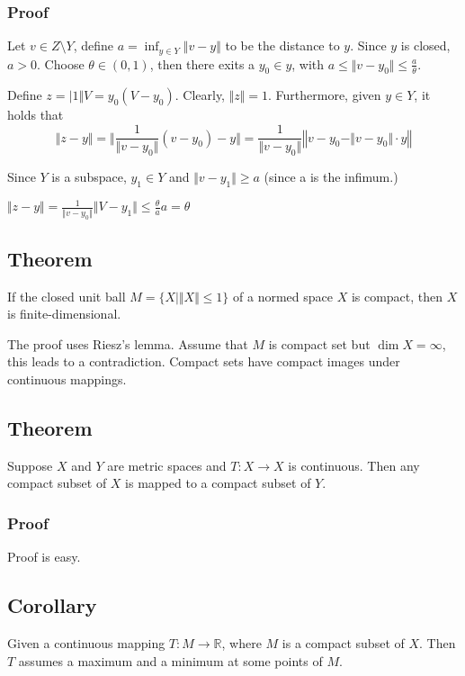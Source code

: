 \documentclass[11pt]{article}
\def\R{\mathbb{R}}
\begin{document}
\subsubsection{Proof}
\label{sec:orgabf9259}
Let \(v\in Z \setminus Y\), define \(a = \inf_{y \in Y} \Vert v - y\Vert\) to
be the distance to \(y\). Since \(y\) is closed, \(a>0\). Choose \(\theta \in (0,
    1)\), then there exits a \(y_0 \in y\), with \(a \le \Vert v - y_0 \Vert \le
    \frac{a}{\theta}\).

Define \(z = \vert{1}{\Vert V = y_0}(V-y_0)\). Clearly, \(\Vert z\Vert = 1\).
Furthermore, given \(y\in Y\), it holds that $$\Vert z - y\Vert =
    \Vert\frac{1}{\Vert v - y_0\Vert}(v -y_0) - y\Vert = \frac{1}{\Vert v -
    y_0\Vert} \left\Vert v - y_0 - \Vert v-y_0\Vert\cdot y\right\Vert$$

Since \(Y\) is a subspace, \(y_1 \in Y\) and \(\Vert v - y_1\Vert \ge a\) (since a
is the infimum.)

\(\Vert z - y\Vert = \frac{1}{\Vert v - y_0\Vert} \Vert V - y_1\Vert \le
    \frac{\theta}{a}a = \theta\)
\subsection{Theorem}
\label{sec:orgf4a3734}
If the closed unit ball \(M=\{X \vert \Vert X \Vert \le 1\}\) of a normed space
\(X\) is compact, then \(X\) is finite-dimensional.

The proof uses Riesz's lemma. Assume that \(M\) is compact set but \(\dim X =
   \infty\), this leads to a contradiction. Compact sets have compact images
under continuous mappings.
\subsection{Theorem}
\label{sec:org106ded6}
Suppose \(X\) and \(Y\) are metric spaces and \(T \colon X \rightarrow X\) is
continuous. Then any compact subset of \(X\) is mapped to a compact subset of
\(Y\).
\subsubsection{Proof}
\label{sec:org8d51548}
Proof is easy.
\subsection{Corollary}
\label{sec:org3306531}
Given a continuous mapping \(T \colon M \rightarrow \R\), where \(M\) is a
compact subset of \(X\). Then \(T\) assumes a maximum and a minimum at some
points of \(M\).
\end{document}
